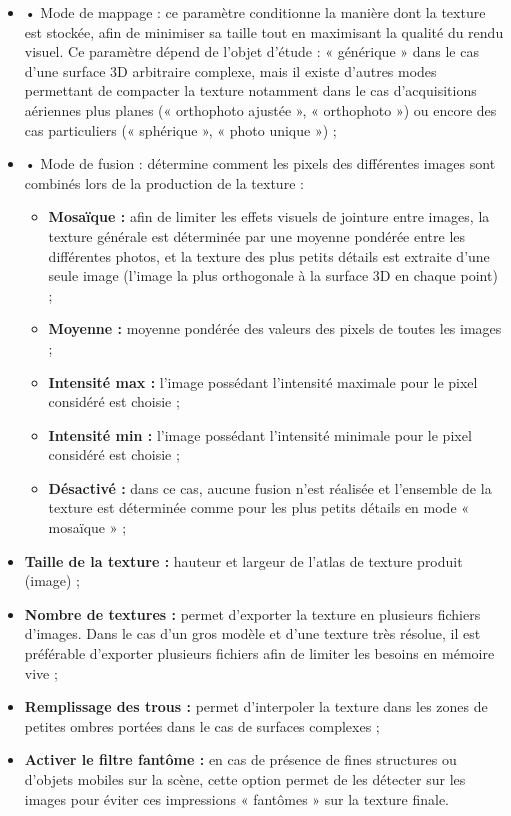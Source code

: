 \begin{itemize}
    \item •	Mode de mappage : ce paramètre conditionne la manière dont la texture est stockée, afin de minimiser sa taille tout en maximisant la qualité du rendu visuel. Ce paramètre dépend de l’objet d’étude : « générique » dans le cas d’une surface 3D arbitraire complexe, mais il existe d’autres modes permettant de compacter la texture notamment dans le cas d’acquisitions aériennes plus planes (« orthophoto ajustée », « orthophoto ») ou encore des cas particuliers (« sphérique », « photo unique ») ;
    
    \item •	Mode de fusion : détermine comment les pixels des différentes images sont combinés lors de la production de la texture :
    
    \begin{itemize}
        \item \textbf{Mosaïque :} afin de limiter les effets visuels de jointure entre images, la texture générale est déterminée par une moyenne pondérée entre les différentes photos, et la texture des plus petits détails est extraite d’une seule image (l’image la plus orthogonale à la surface 3D en chaque point) ;
        
        \item \textbf{Moyenne :} moyenne pondérée des valeurs des pixels de toutes les images ;
        
        \item \textbf{Intensité max :} l’image possédant l’intensité maximale pour le pixel considéré est choisie ;
        
        \item \textbf{Intensité min :} l’image possédant l’intensité minimale pour le pixel considéré est choisie ;
        
        \item \textbf{Désactivé :} dans ce cas, aucune fusion n’est réalisée et l’ensemble de la texture est déterminée comme pour les plus petits détails en mode « mosaïque » ;
    \end{itemize}
    
    \item \textbf{Taille de la texture :} hauteur et largeur de l’atlas de texture produit (image) ;
    
    \item \textbf{Nombre de textures :} permet d’exporter la texture en plusieurs fichiers d’images. Dans le cas d’un gros modèle et d’une texture très résolue, il est préférable d’exporter plusieurs fichiers afin de limiter les besoins en mémoire vive ;
    
    \item \textbf{Remplissage des trous :} permet d’interpoler la texture dans les zones de petites ombres portées dans le cas de surfaces complexes ;
    
    \item \textbf{Activer le filtre fantôme :} en cas de présence de fines structures ou d’objets mobiles sur la scène, cette option permet de les détecter sur les images pour éviter ces impressions « fantômes » sur la texture finale.
\end{itemize}

